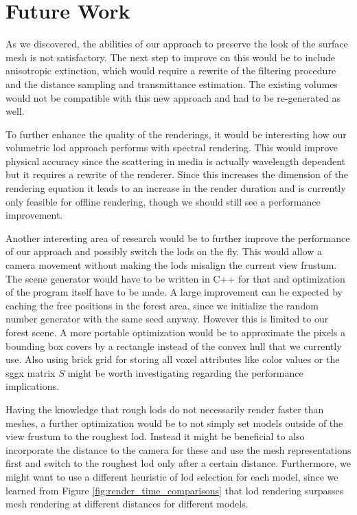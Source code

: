 \chapter{Future Work}
\label{chap:future_work}
As we discovered, the abilities of our approach to preserve the look of the surface mesh is not satisfactory.
The next step to improve on this would be to include anisotropic extinction, which would require a rewrite of the filtering procedure and the distance sampling and transmittance estimation.
The existing volumes would not be compatible with this new approach and had to be re-generated as well.

To further enhance the quality of the renderings, it would be interesting how our volumetric \ac{lod} approach performs with spectral rendering.
This would improve physical accuracy since the scattering in media is actually wavelength dependent \cite{novak_overview} but it requires a rewrite of the renderer.
Since this increases the dimension of the rendering equation it leads to an increase in the render duration and is currently only feasible for offline rendering, though we should still see a performance improvement.

Another interesting area of research would be to further improve the performance of our approach and possibly switch the \acsp{lod} on the fly.
This would allow a camera movement without making the \acsp{lod} misalign the current view frustum.
The scene generator would have to be written in C++ for that and optimization of the program itself have to be made.
A large improvement can be expected by caching the free positions in the forest area, since we initialize the random number generator with the same seed anyway.
However this is limited to our forest scene.
A more portable optimization would be to approximate the pixels a bounding box covers by a rectangle instead of the convex hull that we currently use.
Also using brick grid for storing all voxel attributes like color values or the \ac{sggx} matrix $S$ might be worth investigating regarding the performance implications.

Having the knowledge that rough \acsp{lod} do not necessarily render faster than meshes, a further optimization would be to not simply set models outside of the view frustum to the roughest \ac{lod}.
Instead it might be beneficial to also incorporate the distance to the camera for these and use the mesh representations first and switch to the roughest \ac{lod} only after a certain distance.
Furthermore, we might want to use a different heuristic of \ac{lod} selection for each model, since we learned from Figure \ref{fig:render_time_comparisons} that \ac{lod} rendering surpasses mesh rendering at different distances for different models.